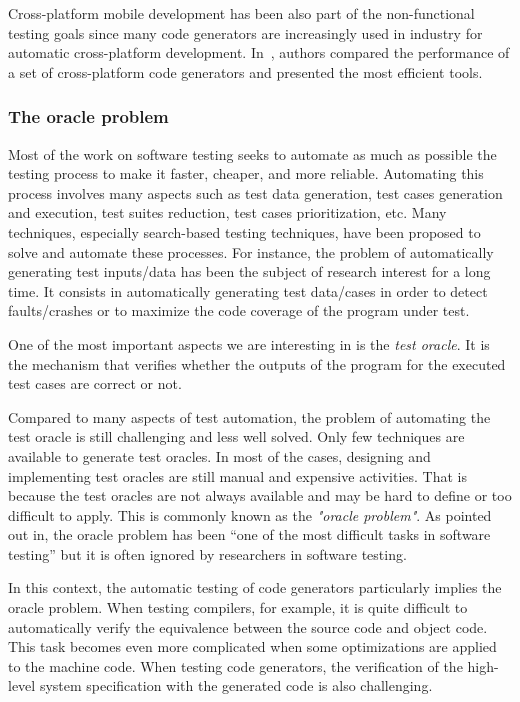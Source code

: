 Cross-platform mobile development has been also part of the non-functional testing goals since many code generators are increasingly used in industry for automatic cross-platform development. In~\cite{pazirandeh2015evaluation,hartmann2011cross}, authors compared the performance of a set of cross-platform code generators and presented the most efficient tools.



\subsubsection{The oracle problem}
\label{sec:The oracle problem}

Most of the work on software testing seeks to automate as much as possible the testing process to make it faster, cheaper, and more reliable. 
Automating this process involves many aspects such as test data generation, test cases generation and execution, test suites reduction, test cases prioritization, etc. Many techniques, especially search-based testing techniques, have been proposed to solve and automate these processes\cite{ali2010systematic}.
For instance, the problem of automatically generating test inputs/data has been the subject of research interest for a long time. It consists in automatically generating test data/cases in order to detect faults/crashes or to maximize the code coverage of the program under test. 

One of the most important aspects we are interesting in is the \textit{test oracle}. It is the mechanism that verifies whether the outputs of the program for the executed test cases are correct or not.

Compared to many aspects of test automation, the problem of automating the test oracle is still challenging and less well solved. Only few techniques are available to generate test oracles. In most of the cases, designing and implementing test oracles are still manual and expensive activities. That is because the test oracles are not always available and may be hard to define or too difficult to apply\cite{barr2015oracle}. This is commonly known as the \textit{"oracle problem"}. 
As pointed out in\cite{manolache2001software}, the oracle problem has been ``one of the most difficult tasks in software testing'' but it is often ignored by researchers in software testing.

In this context, the automatic testing of code generators particularly implies the oracle problem. When testing compilers, for example, it is quite difficult to automatically verify the equivalence between the source code and object code. This task becomes even more complicated when some optimizations are applied to the machine code. 
When testing code generators, the verification of the high-level system specification with the generated code is also challenging.  

